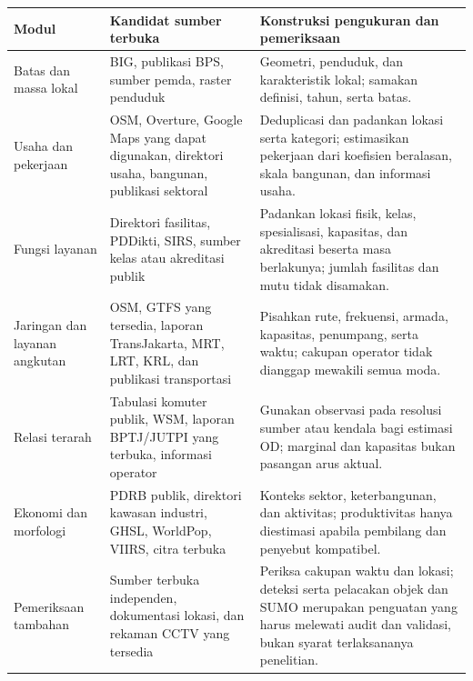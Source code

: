 \documentclass[11pt,a4paper,oneside,openany,indonesian]{report}
\begin{document}
{\def\LTcaptype{none} %
\begin{longtable}[]{@{}
  >{\raggedright\arraybackslash}p{}
  >{\raggedright\arraybackslash}p{}
  >{\raggedright\arraybackslash}p{}@{}}
\toprule\noalign{}
\begin{minipage}[b]{\linewidth}\raggedright
Modul
\end{minipage} & \begin{minipage}[b]{\linewidth}\raggedright
Kandidat sumber terbuka
\end{minipage} & \begin{minipage}[b]{\linewidth}\raggedright
Konstruksi pengukuran dan pemeriksaan
\end{minipage} \\
\midrule\noalign{}
\endhead
\bottomrule\noalign{}
\endlastfoot
Batas dan massa lokal & BIG, publikasi BPS, sumber pemda, raster
penduduk & Geometri, penduduk, dan karakteristik lokal; samakan
definisi, tahun, serta batas. \\
Usaha dan pekerjaan & OSM, Overture, Google Maps yang dapat digunakan,
direktori usaha, bangunan, publikasi sektoral & Deduplicasi dan padankan
lokasi serta kategori; estimasikan pekerjaan dari koefisien beralasan,
skala bangunan, dan informasi usaha. \\
Fungsi layanan & Direktori fasilitas, PDDikti, SIRS, sumber kelas atau
akreditasi publik & Padankan lokasi fisik, kelas, spesialisasi,
kapasitas, dan akreditasi beserta masa berlakunya; jumlah fasilitas dan
mutu tidak disamakan. \\
Jaringan dan layanan angkutan & OSM, GTFS yang tersedia, laporan
TransJakarta, MRT, LRT, KRL, dan publikasi transportasi & Pisahkan rute,
frekuensi, armada, kapasitas, penumpang, serta waktu; cakupan operator
tidak dianggap mewakili semua moda. \\
Relasi terarah & Tabulasi komuter publik, WSM, laporan BPTJ/JUTPI yang
terbuka, informasi operator & Gunakan observasi pada resolusi sumber
atau kendala bagi estimasi OD; marginal dan kapasitas bukan pasangan
arus aktual. \\
Ekonomi dan morfologi & PDRB publik, direktori kawasan industri, GHSL,
WorldPop, VIIRS, citra terbuka & Konteks sektor, keterbangunan, dan
aktivitas; produktivitas hanya diestimasi apabila pembilang dan penyebut
kompatibel. \\
Pemeriksaan tambahan & Sumber terbuka independen, dokumentasi lokasi,
dan rekaman CCTV yang tersedia & Periksa cakupan waktu dan lokasi;
deteksi serta pelacakan objek dan SUMO merupakan penguatan yang harus
melewati audit dan validasi, bukan syarat terlaksananya penelitian. \\
\end{longtable}
}
\end{document}
